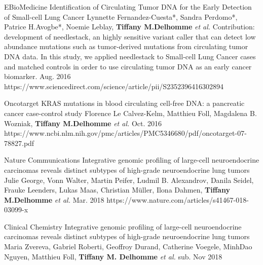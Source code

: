 \begin{cventries}
  \cvpublicationentry
    {EBioMedicine} %
    {Identification of Circulating Tumor DNA for the Early Detection of Small-cell Lung Cancer} %
    {Lynnette Fernandez-Cuesta*, Sandra Perdomo*, Patrice H.Avogbe*, Noemie Leblay, \textbf{Tiffany M.Delhomme} \textit{et al.}} %
    {Contribution: development of needlestack, an highly sensitive variant caller that can detect low abundance mutations such as tumor-derived mutations from circulating tumor DNA data. In this study, we applied needlestack to Small-cell Lung Cancer cases and matched controls in order to use circulating tumor DNA as an early cancer biomarker. }
    {Aug. 2016} %
    {https://www.sciencedirect.com/science/article/pii/S2352396416302894}

  \cvpublicationentry
    {Oncotarget} %
    {KRAS mutations in blood circulating cell-free DNA: a pancreatic
cancer case-control study} %
    {Florence Le Calvez-Kelm, Matthieu Foll, Magdalena B. Wozniak, \textbf{Tiffany M.Delhomme} \textit{et al.}} %
    {}
    {Oct. 2016} %
    {https://www.ncbi.nlm.nih.gov/pmc/articles/PMC5346680/pdf/oncotarget-07-78827.pdf}

  \cvpublicationentry
    {Nature Communications} %
    {Integrative genomic profiling of large-cell neuroendocrine carcinomas reveals distinct subtypes of high-grade neuroendocrine lung tumors} %
    {Julie George, Vonn Walter, Martin Peifer, Ludmil B. Alexandrov, Danila Seidel, Frauke Leenders, Lukas Maas, Christian Müller, Ilona Dahmen, \textbf{Tiffany M.Delhomme} \textit{et al.}} %
    {}
    {Mar. 2018} %
    {https://www.nature.com/articles/s41467-018-03099-x}


	\cvpublicationentry
    {Clinical Chemistry} %
    {Integrative genomic profiling of large-cell neuroendocrine carcinomas reveals distinct subtypes of high-grade neuroendocrine lung tumors} %
    {Maria Zvereva, Gabriel Roberti, Geoffroy Durand, Catherine Voegele, MinhDao Nguyen, Matthieu Foll, \textbf{Tiffany M. Delhomme} \textit{et al.}} %
    {}
    {sub. Nov 2018} %
    {}


\end{cventries}
